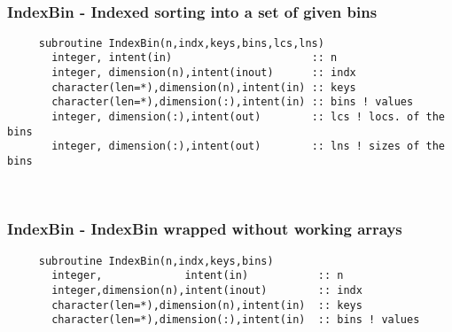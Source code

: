  
\mbox{}\hrulefill\ 
 
  \subsubsection{IndexBin - Indexed sorting into a set of given bins}

\begin{verbatim} 
     subroutine IndexBin(n,indx,keys,bins,lcs,lns)
       integer, intent(in)                      :: n
       integer, dimension(n),intent(inout)      :: indx
       character(len=*),dimension(n),intent(in) :: keys
       character(len=*),dimension(:),intent(in) :: bins ! values
       integer, dimension(:),intent(out)        :: lcs ! locs. of the bins
       integer, dimension(:),intent(out)        :: lns ! sizes of the bins
 \end{verbatim}
%
 
 
\mbox{}\hrulefill\ 
 

  \subsubsection{IndexBin - IndexBin wrapped without working arrays}
  
\begin{verbatim} 
     subroutine IndexBin(n,indx,keys,bins)
       integer,             intent(in)           :: n
       integer,dimension(n),intent(inout)        :: indx
       character(len=*),dimension(n),intent(in)  :: keys
       character(len=*),dimension(:),intent(in)  :: bins ! values
 \end{verbatim}
%


 
 
